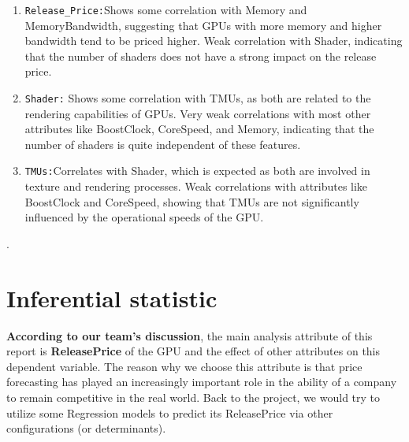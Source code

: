 \documentclass[a4paper]{article}
\theoremstyle{definition}
\begin{document}
\begin{enumerate}
      \item \verb|Release_Price:|Shows some correlation with Memory and Memory\textunderscore Bandwidth, suggesting that GPUs with more memory and higher bandwidth tend to be priced higher. Weak correlation with Shader, indicating that the number of shaders does not have a strong impact on the release price.

      \item \verb|Shader:| Shows some correlation with TMUs, as both are related to the rendering capabilities of GPUs. Very weak correlations with most other attributes like Boost\textunderscore Clock, Core\textunderscore Speed, and Memory, indicating that the number of shaders is quite independent of these features.

      \item \verb|TMUs:|Correlates with Shader, which is expected as both are involved in texture and rendering processes. Weak correlations with attributes like Boost\textunderscore Clock and Core\textunderscore Speed, showing that TMUs are not significantly influenced by the operational speeds of the GPU.
\end{enumerate}.
\pagebreak
\section{Inferential statistic}
\textbf{According to our team's discussion}, the main analysis attribute of this report is \textbf{Release\textunderscore Price} of the GPU and the effect of other attributes on this dependent variable. The reason why we choose this attribute is that price forecasting has played an increasingly important role in the ability of a company to remain competitive in the real world. Back to the project, we would try to utilize some Regression models to predict its Release\textunderscore Price via other configurations (or determinants).
\end{document}
